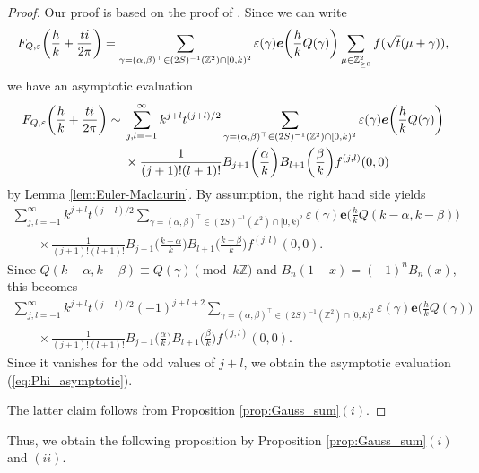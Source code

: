 \documentclass[11pt]{article}
\numberwithin{equation}{section}
\newcommand{\veps}{\varepsilon}
\newcommand{\Z}{\mathbb{Z}}
\numberwithin{equation}{section}
\newcommand{\trans}[1]{#1^\top}
\begin{document}
\begin{proof}
	Our proof is based on the proof of \cite[Lemma 3.2]{BMM}.
	Since we can write
	\begin{gather*}
	F_{Q, \veps} \bigg( \frac{h}{k} + \frac{t{\rm i}}{2\pi} \bigg)
	=
	\sum_{\gamma = \trans{(\alpha, \beta)} \in (2S)^{-1}(\Z^2) \cap [0, k)^2} \veps(\gamma) \bm{e}\bigg(\frac{h}{k} Q(\gamma)\bigg)
	\sum_{\mu \in \Z_{\ge 0}^2} f(\sqrt{t}(\mu + \gamma)),
	\end{gather*}
	we have an asymptotic evaluation
	\begin{align*}
		F_{Q, \veps} \bigg( \frac{h}{k} + \frac{t{\rm i}}{2\pi} \bigg)
\sim{} &\sum_{j,l = -1}^{\infty} k^{j+l} t^{(j+l)/2}
\sum_{\gamma = \trans{(\alpha, \beta)} \in (2S)^{-1}(\Z^2) \cap [0, k)^2} \veps(\gamma) \bm{e}\bigg(\frac{h}{k} Q(\gamma)\bigg)
\\
		&\times\frac{1}{(j+1)! (l+1)!} B_{j+1}\bigg( \frac{\alpha}{k} \bigg) B_{l+1}\bigg( \frac{\beta}{k} \bigg) f^{(j, l)}(0, 0)
	\end{align*}
	by Lemma \ref{lem:Euler-Maclaurin}.
	By assumption, the right hand side yields
	\begin{gather*}
		\sum_{j,l = -1}^{\infty} k^{j+l} t^{(j+l)/2}
		\sum_{\gamma = \trans{(\alpha, \beta)} \in (2S)^{-1}(\Z^2) \cap [0, k)^2} \veps(\gamma) \bm{e}\bigg( \frac{h}{k} Q(k - \alpha, k - \beta) \bigg)
\\ \qquad
		{}\times\frac{1}{(j+1)! (l+1)!} B_{j+1}\bigg( \frac{k - \alpha}{k} \bigg) B_{l+1}\bigg( \frac{k - \beta}{k} \bigg) f^{(j, l)}(0, 0).
	\end{gather*}
	Since $ Q(k - \alpha, k - \beta) \equiv Q(\gamma) \pmod{k\Z} $ and $ B_n(1-x) = (-1)^n B_n(x) $, this becomes
	\begin{gather*}
		\sum_{j,l = -1}^{\infty} k^{j+l} t^{(j+l)/2} (-1)^{j+l+2}
		\sum_{\gamma = \trans{(\alpha, \beta)} \in (2S)^{-1}(\Z^2) \cap [0, k)^2} \veps(\gamma) \bm{e}\bigg(\frac{h}{k} Q(\gamma)\bigg)
\\ \qquad
		{}\times\frac{1}{(j+1)! (l+1)!} B_{j+1}\bigg( \frac{\alpha}{k} \bigg) B_{l+1}\bigg( \frac{\beta}{k} \bigg) f^{(j, l)}(0, 0).
	\end{gather*}
	Since it vanishes for the odd values of $ j+l $, we obtain the asymptotic evaluation (\ref{eq:Phi_asymptotic}).
	
	The latter claim follows from Proposition \ref{prop:Gauss_sum}$(i)$.
\end{proof}

Thus, we obtain the following proposition by Proposition \ref{prop:Gauss_sum}$(i)$ and $(ii)$.
\end{document}
